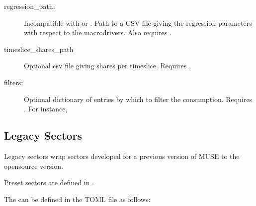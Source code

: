 \documentclass[letterpaper,10pt,english]{sphinxmanual}
\begin{document}
\label{\detokenize{inputs/toml:preset-regression}}\begin{description}
\item[{regression\_path:}] \leavevmode
Incompatible with  or
. Path to a CSV file giving the regression
parameters with respect to the macrodrivers.
Also requires .

\item[{timeslice\_shares\_path}] \leavevmode
Optional csv file giving shares per timeslice. Requires
.

\item[{filters:}] \leavevmode
Optional dictionary of entries by which to filter the consumption.  Requires
. For instance,

\begin{sphinxVerbatim}[commandchars=\\\{\}]
  \PYG{p}{[} \PYG{p}{]}
  \PYG{p}{[} \PYG{p}{]}
\end{sphinxVerbatim}

\end{description}


\subsection{Legacy Sectors}
\label{\detokenize{inputs/toml:legacy-sectors}}
Legacy sectors wrap sectors developed for a previous version of MUSE to the open\sphinxhyphen{}source
version.

Preset sectors are defined in .

The can be defined in the TOML file as follows:
\end{document}
